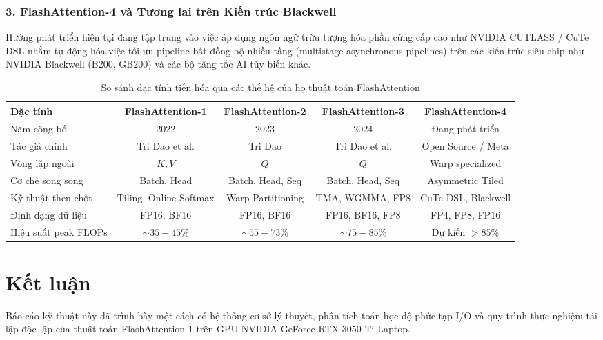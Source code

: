 \documentclass[10pt,a4paper]{article}
\begin{document}
\subsubsection{3. FlashAttention-4 và Tương lai trên Kiến trúc Blackwell}
Hướng phát triển hiện tại đang tập trung vào việc áp dụng ngôn ngữ trừu tượng hóa phần cứng cấp cao như NVIDIA CUTLASS / CuTe DSL nhằm tự động hóa việc tối ưu pipeline bất đồng bộ nhiều tầng (multistage asynchronous pipelines) trên các kiến trúc siêu chip như NVIDIA Blackwell (B200, GB200) và các bộ tăng tốc AI tùy biến khác.

\begin{table}[htbp]
\centering
\caption{So sánh đặc tính tiến hóa qua các thế hệ của họ thuật toán FlashAttention}
\label{tab:fa_evolution}
\small
\setlength{\tabcolsep}{4.5pt}
\begin{tabular}{lcccc}
\toprule
\textbf{Đặc tính} & \textbf{FlashAttention-1} & \textbf{FlashAttention-2} & \textbf{FlashAttention-3} & \textbf{FlashAttention-4} \\
\midrule
Năm công bố & 2022 & 2023 & 2024 & Đang phát triển \\
Tác giả chính & Tri Dao et al. & Tri Dao & Tri Dao et al. & Open Source / Meta \\
Vòng lặp ngoài & $K, V$ & $Q$ & $Q$ & Warp specialized \\
Cơ chế song song & Batch, Head & Batch, Head, Seq & Batch, Head, Seq & Asymmetric Tiled \\
Kỹ thuật then chốt & Tiling, Online Softmax & Warp Partitioning & TMA, WGMMA, FP8 & CuTe-DSL, Blackwell \\
Định dạng dữ liệu & FP16, BF16 & FP16, BF16 & FP16, BF16, FP8 & FP4, FP8, FP16 \\
Hiệu suất peak FLOPs & $\sim 35 - 45\%$ & $\sim 55 - 73\%$ & $\sim 75 - 85\%$ & Dự kiến $> 85\%$ \\
\bottomrule
\end{tabular}
\end{table}

\section{Kết luận}
\label{sec:conclusion}
Báo cáo kỹ thuật này đã trình bày một cách có hệ thống cơ sở lý thuyết, phân tích toán học độ phức tạp I/O và quy trình thực nghiệm tái lập độc lập của thuật toán FlashAttention-1 trên GPU NVIDIA GeForce RTX 3050 Ti Laptop.
\end{document}

